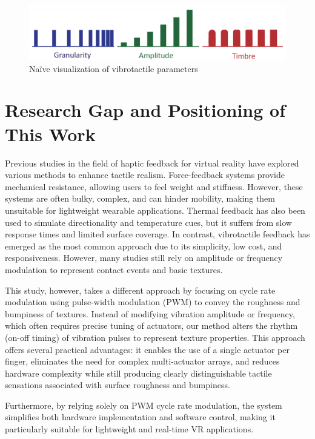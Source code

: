 \begin{figure}[H]\centering
	\includegraphics[width=1\textwidth]{Pictures/Texture_Rendering_2.png}%
	\caption{Naïve visualization of vibrotactile parameters\cite{10.1145/3025453.3025812}}\label{fig:Texture_Rendering_2}%
\end{figure}


\section{Research Gap and Positioning of This Work}
Previous studies in the field of haptic feedback for virtual reality have explored various methods to enhance tactile realism. Force-feedback systems provide mechanical resistance, allowing users to feel weight and stiffness. However, these systems are often bulky, complex, and can hinder mobility, making them unsuitable for lightweight wearable applications. Thermal feedback has also been used to simulate directionality and temperature cues, but it suffers from slow response times and limited surface coverage. In contrast, vibrotactile feedback has emerged as the most common approach due to its simplicity, low cost, and responsiveness. However, many studies still rely on amplitude or frequency modulation to represent contact events and basic textures.

This study, however, takes a different approach by focusing on cycle rate modulation using pulse-width modulation (PWM) to convey the roughness and bumpiness of textures. Instead of modifying vibration amplitude or frequency, which often requires precise tuning of actuators, our method alters the rhythm (on-off timing) of vibration pulses to represent texture properties. This approach offers several practical advantages: it enables the use of a single actuator per finger, eliminates the need for complex multi-actuator arrays, and reduces hardware complexity while still producing clearly distinguishable tactile sensations associated with surface roughness and bumpiness. 

Furthermore, by relying solely on PWM cycle rate modulation, the system simplifies both hardware implementation and software control, making it particularly suitable for lightweight and real-time VR applications.

